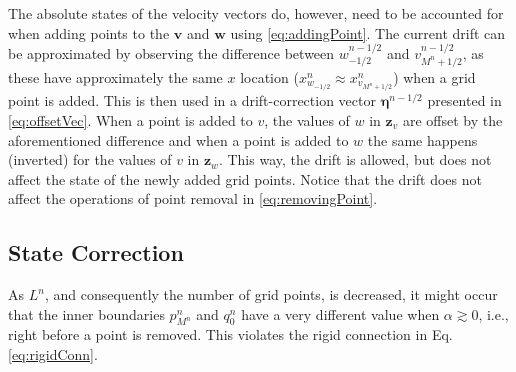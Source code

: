 The absolute states of the velocity vectors do, however, need to be accounted for when adding points to the $\mathbf{v}$ and $\mathbf{w}$ using \eqref{eq:addingPoint}. The current drift can be approximated by observing the difference between $w_{-1/2}^{n-1/2}$ and $v_{M^n+1/2}^{n-1/2}$, as these have approximately the same $x$ location ($x_{w_{-1/2}}^n \approx x_{v_{M^n+1/2}}^n$) when a grid point is added. This is then used in a drift-correction vector $\boldsymbol{\eta}^{n-1/2}$ presented in \eqref{eq:offsetVec}. When a point is added to $v$, the values of $w$ in $\mathbf{z}_{v}$ are offset by the aforementioned difference and when a point is added to $w$ the same happens (inverted) for the values of $v$ in $\mathbf{z}_w$. This way, the drift is allowed, but does not affect the state of the newly added grid points. Notice that the drift does not affect the operations of point removal in \eqref{eq:removingPoint}.

\subsection{State Correction}
As $L^n$, and consequently the number of grid points, is decreased, it might occur that the inner boundaries $p_{M^n}^n$ and $q_0^n$ have a very different value when $\alpha \gtrsim 0$, i.e., right before a point is removed. This violates the rigid connection in Eq. \eqref{eq:rigidConn}. 

